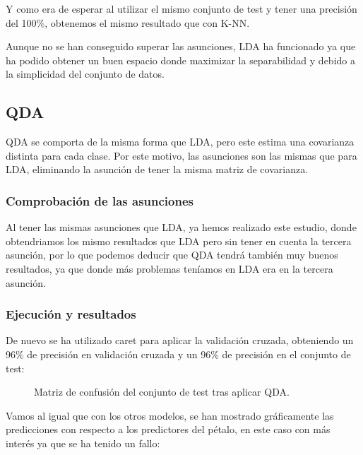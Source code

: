 \begin{figure}[H]
	\centering
	
	\label{fig:predicciones_lda}
\end{figure}

Y como era de esperar al utilizar el mismo conjunto de test y tener una precisión del 100\%, obtenemos el mismo resultado que con K-NN.

Aunque no se han conseguido superar las asunciones, LDA ha funcionado ya que ha podido obtener un buen espacio donde maximizar la separabilidad y debido a la simplicidad del conjunto de datos.

\subsection{QDA}

QDA se comporta de la misma forma que LDA, pero este estima una covarianza distinta para cada clase. Por este motivo, las asunciones son las mismas que para LDA, eliminando la asunción de tener la misma matriz de covarianza.

\subsubsection{Comprobación de las asunciones}

Al tener las mismas asunciones que LDA, ya hemos realizado este estudio, donde obtendriamos los mismo resultados que LDA pero sin tener en cuenta la tercera asunción, por lo que podemos deducir que QDA tendrá también muy buenos resultados, ya que donde más problemas teníamos en LDA era en la tercera asunción.

\subsubsection{Ejecución y resultados}

De nuevo se ha utilizado caret para aplicar la validación cruzada, obteniendo un 96\% de precisión en validación cruzada y un 96\% de precisión en el conjunto de test:


\begin{figure}[H]
	\centering
	
	\caption{Matriz de confusión del conjunto de test tras aplicar QDA.}
	\label{fig:matriz_confusion_qda}
\end{figure}

Vamos al igual que con los otros modelos, se han mostrado gráficamente las predicciones con respecto a los predictores del pétalo, en este caso con más interés ya que se ha tenido un fallo:

